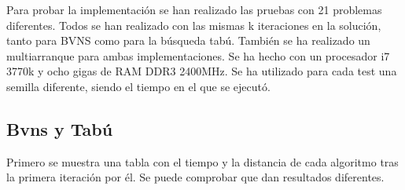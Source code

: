 
Para probar la implementación se han realizado las pruebas con 21 problemas diferentes. Todos se han realizado con las mismas k iteraciones en la solución, tanto para BVNS como para la búsqueda tabú. También se ha realizado un multiarranque para ambas implementaciones. Se ha hecho con un procesador i7 3770k y ocho gigas de RAM DDR3 2400MHz. Se ha utilizado para cada test una semilla diferente, siendo el tiempo en el que se ejecutó.

\subsection{Bvns y Tabú}

Primero se muestra una tabla con el tiempo y la distancia de cada algoritmo tras la primera iteración por él. Se puede comprobar que dan resultados diferentes.
